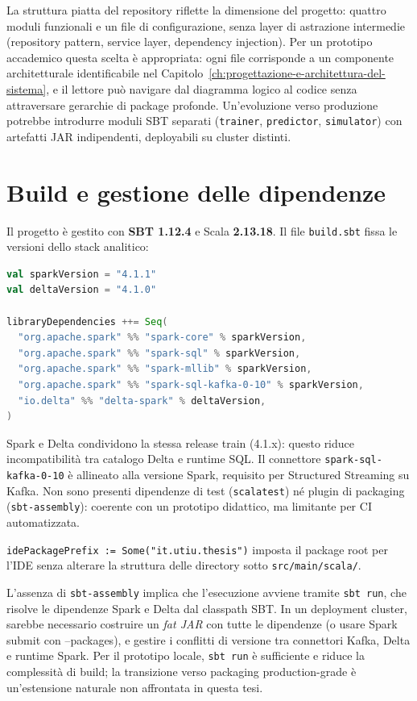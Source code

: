 La struttura piatta del repository riflette la dimensione del progetto: quattro moduli funzionali e un file di configurazione, senza layer di astrazione intermedie (repository pattern, service layer, dependency injection).
Per un prototipo accademico questa scelta è appropriata: ogni file corrisponde a un componente architetturale identificabile nel Capitolo~\ref{ch:progettazione-e-architettura-del-sistema}, e il lettore può navigare dal diagramma logico al codice senza attraversare gerarchie di package profonde.
Un'evoluzione verso produzione potrebbe introdurre moduli SBT separati (\texttt{trainer}, \texttt{predictor}, \texttt{simulator}) con artefatti JAR indipendenti, deployabili su cluster distinti.

\section{Build e gestione delle dipendenze}\label{sec:build-sbt}

Il progetto è gestito con \textbf{SBT 1.12.4} e Scala \textbf{2.13.18}.
Il file \texttt{build.sbt} fissa le versioni dello stack analitico:

\begin{lstlisting}[language=Scala,caption={Dipendenze principali in \texttt{build.sbt}.},label={lst:build-sbt}]
val sparkVersion = "4.1.1"
val deltaVersion = "4.1.0"

libraryDependencies ++= Seq(
  "org.apache.spark" %% "spark-core" % sparkVersion,
  "org.apache.spark" %% "spark-sql" % sparkVersion,
  "org.apache.spark" %% "spark-mllib" % sparkVersion,
  "org.apache.spark" %% "spark-sql-kafka-0-10" % sparkVersion,
  "io.delta" %% "delta-spark" % deltaVersion,
)
\end{lstlisting}

Spark e Delta condividono la stessa release train (4.1.x): questo riduce incompatibilità tra catalogo Delta e runtime SQL.
Il connettore \texttt{spark-sql-kafka-0-10} è allineato alla versione Spark, requisito per Structured Streaming su Kafka.
Non sono presenti dipendenze di test (\texttt{scalatest}) né plugin di packaging (\texttt{sbt-assembly}): coerente con un prototipo didattico, ma limitante per CI automatizzata.

\texttt{idePackagePrefix := Some("it.utiu.thesis")} imposta il package root per l'IDE senza alterare la struttura delle directory sotto \texttt{src/main/scala/}.

L'assenza di \texttt{sbt-assembly} implica che l'esecuzione avviene tramite \texttt{sbt run}, che risolve le dipendenze Spark e Delta dal classpath SBT.
In un deployment cluster, sarebbe necessario costruire un \emph{fat JAR} con tutte le dipendenze (o usare Spark submit con --packages), e gestire i conflitti di versione tra connettori Kafka, Delta e runtime Spark.
Per il prototipo locale, \texttt{sbt run} è sufficiente e riduce la complessità di build; la transizione verso packaging production-grade è un'estensione naturale non affrontata in questa tesi.

